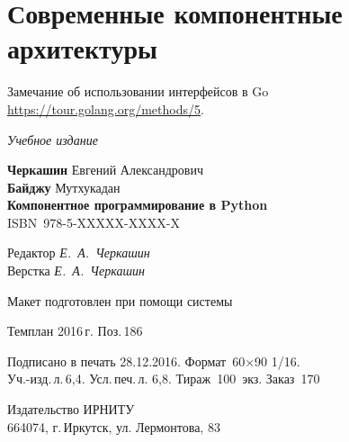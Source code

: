 \documentclass[a4paper,openany,twoside,final]{book}
\providecommand{\DUadmonition}[2][class-arg]{%
  \ifcsname DUadmonition#1\endcsname%
    \csname DUadmonition#1\endcsname{#2}%
  \else
    \begin{center}
      \fbox{\parbox{0.9\textwidth}{#2}}
    \end{center}
  \fi
}
\providecommand*{\DUtitle}[2][class-arg]{%
  \ifcsname DUtitle#1\endcsname%
    \csname DUtitle#1\endcsname{#2}%
  \else
    \smallskip\noindent\textbf{#2}\smallskip%
  \fi
}
\begin{document}





\newpage

\section{Современные компонентные архитектуры}
\label{sec:present}

Замечание об использовании интерфейсов в Go \url{https://tour.golang.org/methods/5}.

\newpage
\thispagestyle{empty}
\mbox{}

\vfill\vfill\vfill\vfill

\hfill{}{\small\itshape Учебное издание}
\vspace{4ex}
\begin{center}
{\small\textbf{Черкашин} Евгений Александрович\\}
{\small\textbf{Байджу} Мутхукадан\\[1em]}
{\bfseries Компонентное программирование в Python}\\[1em]
ISBN~978-5-XXXXX-XXXX-X
\vfill

\small
Редактор \textit{Е.~А.~Черкашин}\\
Верстка \textit{Е.~А.~Черкашин}

\vfill{}
{\small Макет подготовлен при помощи системы \LaTeXsys\\\mbox{}}
\vfill{}

Темплан 2016\,{}г. Поз.\,{}186

\end{center}
\begin{center}\small
\noindent Подписано в печать 28.12.2016.
Формат~60$\times$90 1/16.\\  %
Уч.-изд.\,{}л.\,{}6,4. Усл.\,{}печ.\,{}л. 6,8. Тираж~100~экз. Заказ~170
\end{center}
\vspace{1           ex}
\begin{center}\small
Издательство ИРНИТУ\\{}
664074, г.\,{}Иркутск, ул. Лермонтова, 83 \label{lastpage}
\end{center}
\end{document}
